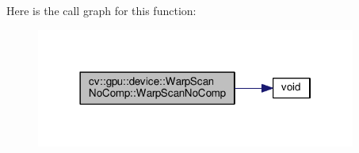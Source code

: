 Here is the call graph for this function\-:\nopagebreak
\begin{figure}[H]
\begin{center}
\leavevmode
\includegraphics[width=298pt]{structcv_1_1gpu_1_1device_1_1WarpScanNoComp_a32e3e5837b0a4c569a927bc1aa5de16e_cgraph}
\end{center}
\end{figure}




